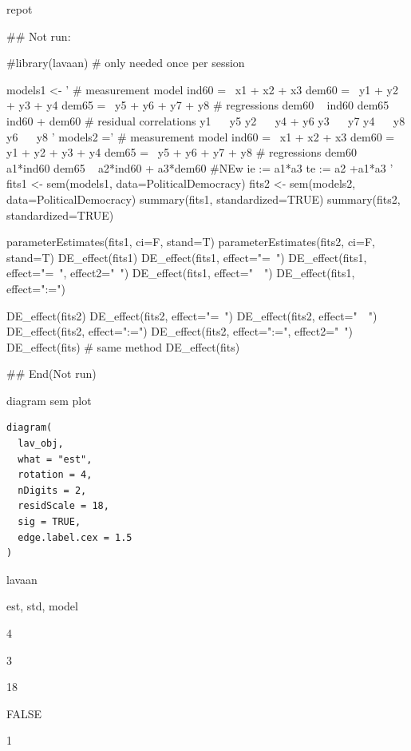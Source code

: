 \documentclass[a4paper]{book}
\begin{document}
%
\begin{Value}
repot
\end{Value}
%
\begin{Examples}
\begin{ExampleCode}
## Not run: 

 #library(lavaan) # only needed once per session

models1 <- '
  # measurement model
    ind60 =~ x1 + x2 + x3
    dem60 =~ y1 + y2 + y3 + y4
    dem65 =~ y5 + y6 + y7 + y8
    # regressions
    dem60 ~ ind60
    dem65 ~ ind60 + dem60
      # residual correlations
    y1 ~~ y5
    y2 ~~ y4 + y6
    y3 ~~ y7
    y4 ~~ y8
    y6 ~~ y8
'
models2 ='
  # measurement model
    ind60 =~ x1 + x2 + x3
    dem60 =~ y1 + y2 + y3 + y4
    dem65 =~ y5 + y6 + y7 + y8
     # regressions
    dem60 ~ a1*ind60
    dem65 ~ a2*ind60 + a3*dem60
 #NEw
   ie := a1*a3
   te := a2 +a1*a3
'
fits1 <- sem(models1, data=PoliticalDemocracy)
fits2 <- sem(models2, data=PoliticalDemocracy)
summary(fits1, standardized=TRUE)
summary(fits2, standardized=TRUE)

parameterEstimates(fits1, ci=F, stand=T)
parameterEstimates(fits2, ci=F, stand=T)
DE_effect(fits1)
DE_effect(fits1, effect="=~")
DE_effect(fits1, effect="=~", effect2="~")
DE_effect(fits1, effect="~~")
DE_effect(fits1, effect=":=")

DE_effect(fits2)
DE_effect(fits2, effect="=~")
DE_effect(fits2, effect="~~")
DE_effect(fits2, effect=":=")
DE_effect(fits2, effect=":=", effect2="~")
 DE_effect(fits)%
 # same method
 DE_effect(fits)%


## End(Not run)


\end{ExampleCode}
\end{Examples}
%
\begin{Description}
diagram sem plot
\end{Description}
%
\begin{Usage}
\begin{verbatim}
diagram(
  lav_obj,
  what = "est",
  rotation = 4,
  nDigits = 2,
  residScale = 18,
  sig = TRUE,
  edge.label.cex = 1.5
)
\end{verbatim}
\end{Usage}
%
\begin{Arguments}
\begin{ldescription}
\item[\code{lav\_obj}] lavaan

\item[\code{what}] est, std, model

\item[\code{rotation}] 4

\item[\code{nDigits}] 3

\item[\code{residScale}] 18

\item[\code{sig}] FALSE

\item[\code{edge.label.cex}] 1
\end{ldescription}
\end{Arguments}
\end{document}
